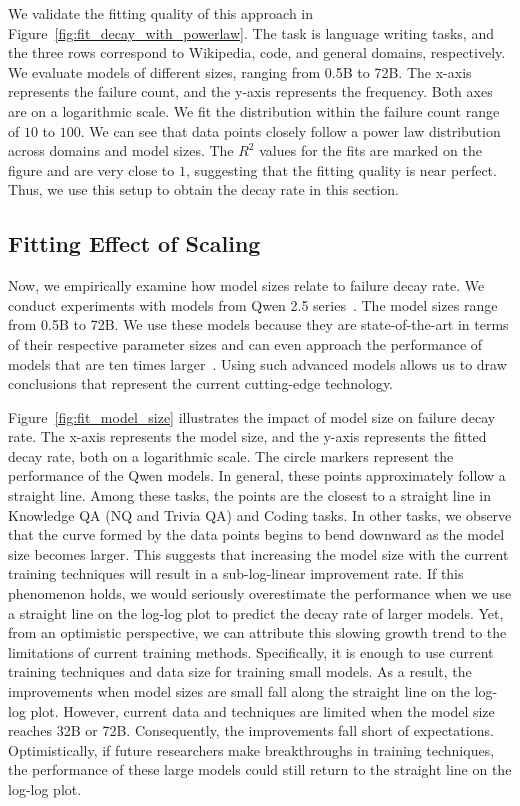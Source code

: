 We validate the fitting quality of this approach in Figure~\ref{fig:fit_decay_with_powerlaw}. The task is language writing tasks, and the three rows correspond to Wikipedia, code, and general domains, respectively. We evaluate models of different sizes, ranging from 0.5B to 72B. The x-axis represents the failure count, and the y-axis represents the frequency. Both axes are on a logarithmic scale. We fit the distribution within the failure count range of $10$ to $100$. We can see that data points closely follow a power law distribution across domains and model sizes. The $R^2$ values for the fits are marked on the figure and are very close to $1$, suggesting that the fitting quality is near perfect. Thus, we use this setup to obtain the decay rate in this section.


\subsection{Fitting Effect of Scaling}
\label{sec:fit_model_scale_to_decay}


Now, we empirically examine how model sizes relate to failure decay rate. We conduct experiments with models from Qwen 2.5 series~\citep{qwen2, qwen2.5}. The model sizes range from 0.5B to 72B. We use these models because they are state-of-the-art in terms of their respective parameter sizes and can even approach the performance of models that are ten times larger~\citep{guo2025deepseek}. Using such advanced models allows us to draw conclusions that represent the current cutting-edge technology.




Figure~\ref{fig:fit_model_size} illustrates the impact of model size on failure decay rate. The x-axis represents the model size, and the y-axis represents the fitted decay rate, both on a logarithmic scale. The circle markers represent the performance of the Qwen models. In general, these points approximately follow a straight line. Among these tasks, the points are the closest to a straight line in Knowledge QA (NQ and Trivia QA) and Coding tasks. 
In other tasks, we observe that the curve formed by the data points begins to bend downward as the model size becomes larger. This suggests that increasing the model size with the current training techniques will result in a sub-log-linear improvement rate. If this phenomenon holds, we would seriously overestimate the performance when we use a straight line on the log-log plot to predict the decay rate of larger models. Yet, from an optimistic perspective, we can attribute this slowing growth trend to the limitations of current training methods. Specifically, it is enough to use current training techniques and data size for training small models. As a result, the improvements when model sizes are small fall along the straight line on the log-log plot. However, current data and techniques are limited when the model size reaches 32B or 72B. Consequently, the improvements fall short of expectations. Optimistically, if future researchers make breakthroughs in training techniques, the performance of these large models could still return to the straight line on the log-log plot.

